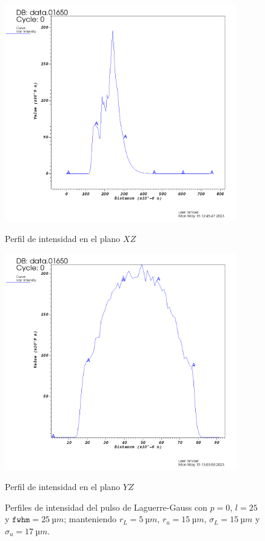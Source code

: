 \begin{figure}[htbp]
  \centering
  \begin{subcaptionblock}{.4\textwidth}
    \centering
    \includegraphics[width=0.9\textwidth]{Figuras/ch4_oam3.png}
    \caption{Perfil de intensidad en el plano $XZ$}\label{fig:ch4_oam3}
  \end{subcaptionblock}
  \begin{subcaptionblock}{.4\textwidth}
    \centering
    \includegraphics[width=0.9\textwidth]{Figuras/ch4_oam4.png}
    \caption{Perfil de intensidad en el plano $YZ$}\label{fig:ch4_oam4}
  \end{subcaptionblock}
   \caption{Perfiles de intensidad del pulso de Laguerre-Gauss con $p=0$, $l=25$ y $\texttt{fwhm}=\qty{25}{µm}$; manteniendo $r_{L}=\qty{5}{µm}$, $r_{u}=\qty{15}{µm}$, $\sigma_{L}=\qty{15}{µm}$ y $\sigma_{u}=\qty{17}{µm}$.}
   \label{fig:4.35}
\end{figure}

